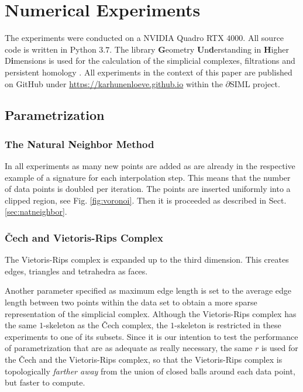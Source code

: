 \documentclass[journal]{IEEEtran}
\begin{document}
\section{Numerical Experiments}
\label{sec:numexp}

The experiments were conducted on a NVIDIA Quadro RTX $4000$. All source code is written in Python $3.7$. The library \textbf{G}eometry \textbf{U}n\textbf{d}erstanding in \textbf{H}igher D\textbf{i}mensions is used for the calculation of the simplicial complexes, filtrations and persistent homology \cite{gudhi:urm}.
All experiments in the context of this paper are published on GitHub under \url{https://karhunenloeve.github.io} within the $\partial$SIML project.

\subsection{Parametrization}

\subsubsection{The Natural Neighbor Method}
In all experiments as many new points are added as are already in the respective example of a signature for each interpolation step. This means that the number of data points is doubled per iteration. The points are inserted uniformly into a clipped region, see Fig. \ref{fig:voronoi}. Then it is proceeded as described in Sect. \ref{sec:natneighbor}.

\subsubsection{\v{C}ech and  Vietoris-Rips Complex}
The Vietoris-Rips complex is expanded up to the third dimension. This creates edges, triangles and tetrahedra as faces.

Another parameter specified as maximum edge length is set to the average edge length between two points within the data set to obtain a more sparse representation of the simplicial complex. Although the Vietoris-Rips complex has the same $1$-skeleton as the \v{C}ech complex, the $1$-skeleton is restricted in these experiments to one of its subsets. Since it is our intention to test the performance of parametrization that are as adequate as really necessary, the same $r$ is used for the \v{C}ech and the Vietoris-Rips complex, so that the Vietoris-Rips complex is topologically \textit{farther away} from the union of closed balls around each data point, but faster to compute.
\end{document}
